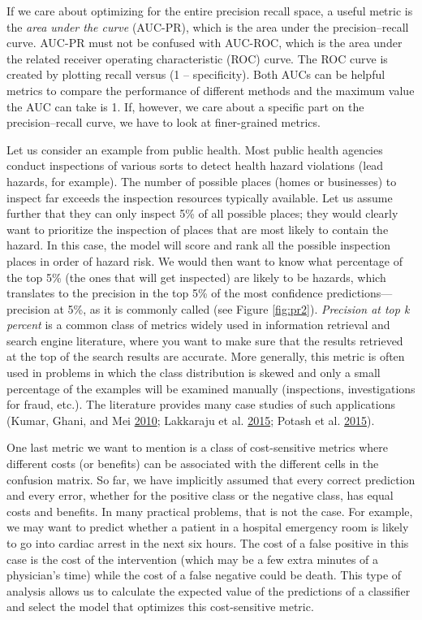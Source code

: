 \documentclass[]{krantz}
\begin{document}
If we care about optimizing for the entire precision recall space, a
useful metric is the \emph{area under the curve} (AUC-PR), which is the
area under the precision--recall curve. AUC-PR must not be confused with
AUC-ROC, which is the area under the related receiver operating
characteristic (ROC) curve. The ROC curve is created by plotting recall
versus (1 -- specificity). Both AUCs can be helpful metrics to compare
the performance of different methods and the maximum value the AUC can
take is 1. If, however, we care about a specific part on the
precision--recall curve, we have to look at finer-grained metrics.

Let us consider an example from public health. Most public health
agencies conduct inspections of various sorts to detect health hazard
violations (lead hazards, for example). The number of possible places
(homes or businesses) to inspect far exceeds the inspection resources
typically available. Let us assume further that they can only inspect
5\% of all possible places; they would clearly want to prioritize the
inspection of places that are most likely to contain the hazard. In this
case, the model will score and rank all the possible inspection places
in order of hazard risk. We would then want to know what percentage of
the top 5\% (the ones that will get inspected) are likely to be hazards,
which translates to the precision in the top 5\% of the most confidence
predictions---precision at 5\%, as it is commonly called (see Figure
\ref{fig:pr2}). \emph{Precision at top k percent} is a common class of
metrics widely used in information retrieval and search engine
literature, where you want to make sure that the results retrieved at
the top of the search results are accurate. More generally, this metric
is often used in problems in which the class distribution is skewed and
only a small percentage of the examples will be examined manually
(inspections, investigations for fraud, etc.). The literature provides
many case studies of such applications (Kumar, Ghani, and Mei
\protect\hyperlink{ref-Kumar2010}{2010}; Lakkaraju et al.
\protect\hyperlink{ref-Lakkaraju2015}{2015}; Potash et al.
\protect\hyperlink{ref-Potash2015}{2015}).

\enlargethispage{6pt} One last metric we want to mention is a class of
cost-sensitive metrics where different costs (or benefits) can be
associated with the different cells in the confusion matrix. So far, we
have implicitly assumed that every correct prediction and every error,
whether for the positive class or the negative class, has equal costs
and benefits. In many practical problems, that is not the case. For
example, we may want to predict whether a patient in a hospital
emergency room is likely to go into cardiac arrest in the next six
hours. The cost of a false positive in this case is the cost of the
intervention (which may be a few extra minutes of a physician's time)
while the cost of a false negative could be death. This type of analysis
allows us to calculate the expected value of the predictions of a
classifier and select the model that optimizes this cost-sensitive
metric.
\end{document}
